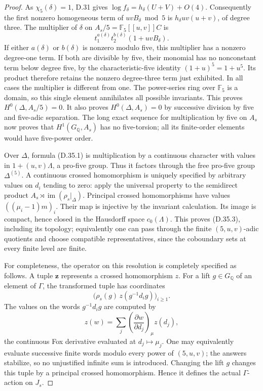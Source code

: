 \begin{proof}
As \(\chi_5(\delta)=1\), D.31 gives
\(\log f_\delta=h_\delta(U+V)+O(4)\).
Consequently the first nonzero homogeneous
term of \(uvB_\delta\bmod5\) is
\(h_\delta uv(u+v)\), of degree three.
The multiplier of \(\delta\) on
\(A_s/5=\mathbb F_5[[u,v]]C\) is
\[
 t_1^{a(\delta)}t_2^{b(\delta)}
                       (1+uvB_\delta).
\]
If either \(a(\delta)\) or \(b(\delta)\)
is nonzero modulo five, this multiplier
has a nonzero degree-one term.
If both are divisible by five, their
monomial has no nonconstant term below
degree five, by the characteristic-five
identity \((1+u)^5=1+u^5\). Its product
therefore retains the nonzero degree-three
term just exhibited. In all cases the
multiplier is different from one.
The power-series ring over \(\mathbb F_5\)
is a domain, so this single element
annihilates all possible invariants.
This proves \(H^0(\Delta,A_s/5)=0\).
It also proves \(H^0(\Delta,A_s)=0\)
by successive division by five and
five-adic separation. The long exact
sequence for multiplication by five on
\(A_s\) now proves that
\(H^1(G_{\mathbb Q},A_s)\) has no
five-torsion; all its finite-order
elements would have five-power order.

Over \(\Delta\), formula (D.35.1) is
multiplication by a continuous character
with values in \(1+(u,v)\Lambda\),
a pro-five group. Thus it factors through
the free pro-five group
\(\Delta^{(5)}\). A continuous crossed
homomorphism is uniquely specified by
arbitrary values on \(d_i\) tending to
zero: apply the universal property to
the semidirect product
\(A_s\rtimes\operatorname{im}(\rho_s|_\Delta)\).
Principal crossed homomorphisms have
values \(((\mu_i-1)m)_i\). Their map is
injective by the invariant calculation.
Its image is compact, hence closed in
the Hausdorff space \(c_0(\Lambda)\).
This proves (D.35.3), including its
topology; equivalently one can pass
through the finite \((5,u,v)\)-adic
quotients and choose compatible
representatives, since the coboundary
sets at every finite level are finite.

For completeness, the operator on this
resolution is completely specified as
follows. A tuple \(\mathbf z\) represents
a crossed homomorphism \(z\). For a
lift \(g\in G_{\mathbb Q}\) of an
element of \(\Gamma\), the transformed
tuple has coordinates
\[
       \bigl(\rho_s(g)\,
             z(g^{-1}d_i g)\bigr)_{i\ge1}.
\]
The values on the words \(g^{-1}d_i g\)
are computed by
\[
 z(w)=\sum_j
       \left(\frac{\partial w}{\partial d_j}\right)_{\mu}
                         z(d_j),
\]
the continuous Fox derivative evaluated
at \(d_j\mapsto\mu_j\).
One may equivalently evaluate successive
finite words modulo every power of
\((5,u,v)\); the answers stabilize,
so no unjustified infinite sum is
introduced. Changing the lift \(g\)
changes this tuple by a principal
crossed homomorphism. Hence it defines
the actual \(\Gamma\)-action on \(J_s\).


\end{proof}
